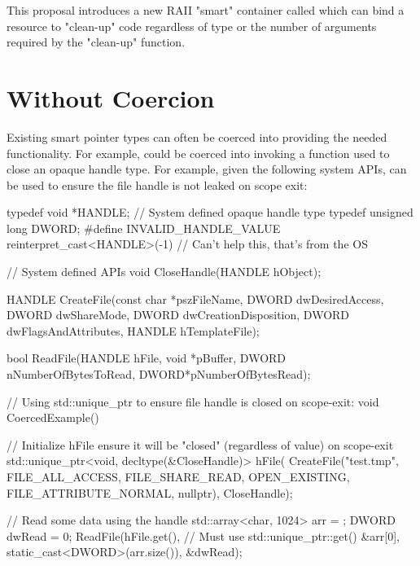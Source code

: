 \documentclass[ebook,11pt,article]{memoir}
\begin{document}
This proposal introduces a new RAII "smart" container called  which can bind a resource to "clean-up" code regardless of type or the number of arguments required by the "clean-up" function.

\section {Without Coercion}
Existing smart pointer types can often be coerced into providing the needed functionality.  For example,  could be coerced into invoking a function used to close an opaque handle type.  For example, given the following system APIs,  can be used to ensure the file handle is not leaked on scope exit:

\begin{codeblock}
typedef void *HANDLE;        // System defined opaque handle type
typedef unsigned long DWORD;
#define INVALID_HANDLE_VALUE reinterpret_cast<HANDLE>(-1)	
// Can't help this, that's from the OS

// System defined APIs
void CloseHandle(HANDLE hObject);

HANDLE CreateFile(const char *pszFileName, 
	DWORD dwDesiredAccess, 
	DWORD dwShareMode, 
	DWORD dwCreationDisposition, 
	DWORD dwFlagsAndAttributes, 
	HANDLE hTemplateFile);

bool ReadFile(HANDLE hFile, 
	void *pBuffer, 
	DWORD nNumberOfBytesToRead, 
	DWORD*pNumberOfBytesRead);

// Using std::unique_ptr to ensure file handle is closed on scope-exit:
void CoercedExample()
{
	// Initialize hFile ensure it will be "closed" (regardless of value) on scope-exit
	std::unique_ptr<void, decltype(&CloseHandle)> hFile(
		CreateFile("test.tmp", 
			FILE_ALL_ACCESS, 
			FILE_SHARE_READ, 
			OPEN_EXISTING, 
			FILE_ATTRIBUTE_NORMAL,
			nullptr), 
		CloseHandle);

	// Read some data using the handle
	std::array<char, 1024> arr = { };
	DWORD dwRead = 0;
	ReadFile(hFile.get(),	// Must use std::unique_ptr::get()
		&arr[0], 
		static_cast<DWORD>(arr.size()), 
		&dwRead);
}
\end{codeblock}
\end{document}
